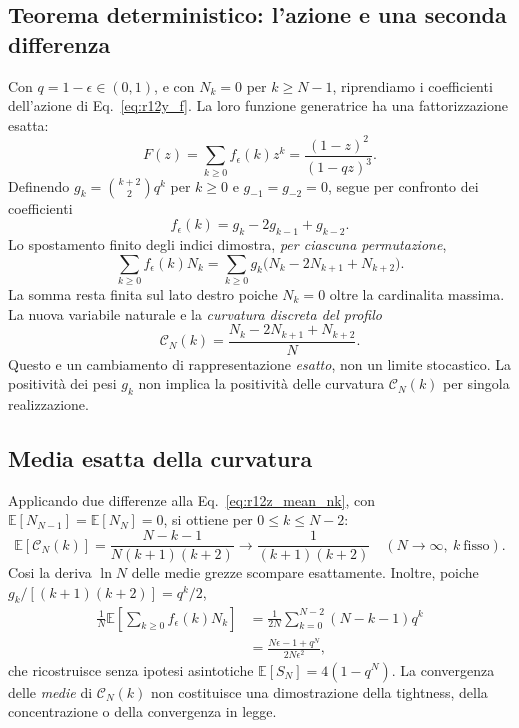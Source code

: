 \documentclass[11pt,a4paper]{article}
\begin{document}
\subsection{Teorema deterministico: l'azione e una seconda differenza}

Con $q=1-\epsilon\in(0,1)$, e con $N_k=0$ per $k\ge N-1$, riprendiamo i coefficienti dell'azione di Eq.~\eqref{eq:r12y_f}. La loro funzione generatrice ha una fattorizzazione esatta:
\begin{equation}
F(z)=\sum_{k\ge0}f_\epsilon(k)z^k
=\frac{(1-z)^2}{(1-qz)^3}.
\label{eq:r12aa_generating}
\end{equation}
Definendo $g_k=\binom{k+2}{2}q^k$ per $k\ge0$ e $g_{-1}=g_{-2}=0$, segue per confronto dei coefficienti
\begin{equation}
f_\epsilon(k)=g_k-2g_{k-1}+g_{k-2}.
\label{eq:r12aa_second_diff_weight}
\end{equation}
Lo spostamento finito degli indici dimostra, \emph{per ciascuna permutazione},
\begin{equation}
\boxed{\sum_{k\ge0}f_\epsilon(k)N_k
=\sum_{k\ge0}g_k\bigl(N_k-2N_{k+1}+N_{k+2}\bigr).}
\label{eq:r12aa_discrete_curvature}
\end{equation}
La somma resta finita sul lato destro poiche $N_k=0$ oltre la cardinalita massima. La nuova variabile naturale e la \emph{curvatura discreta del profilo}
\begin{equation}
\mathcal C_N(k)=\frac{N_k-2N_{k+1}+N_{k+2}}{N}.
\label{eq:r12aa_curvature}
\end{equation}
Questo e un cambiamento di rappresentazione \emph{esatto}, non un limite stocastico. La positivit\`a dei pesi $g_k$ non implica la positivit\`a delle curvatura $\mathcal C_N(k)$ per singola realizzazione.

\subsection{Media esatta della curvatura}

Applicando due differenze alla Eq.~\eqref{eq:r12z_mean_nk}, con $\mathbb E[N_{N-1}]=\mathbb E[N_N]=0$, si ottiene per $0\le k\le N-2$:
\begin{equation}
\boxed{\mathbb E[\mathcal C_N(k)]
=\frac{N-k-1}{N(k+1)(k+2)}
\longrightarrow\frac{1}{(k+1)(k+2)}\quad(N\to\infty,\ k\ \mathrm{fisso}).}
\label{eq:r12aa_curvature_mean}
\end{equation}
Cosi la deriva $\ln N$ delle medie grezze scompare esattamente. Inoltre, poiche $g_k/[(k+1)(k+2)]=q^k/2$,
\begin{align}
\frac{1}{N}\mathbb E\!\left[\sum_{k\ge0}f_\epsilon(k)N_k\right]
&=\frac{1}{2N}\sum_{k=0}^{N-2}(N-k-1)q^k\\
&=\frac{N\epsilon-1+q^N}{2N\epsilon^2},
\label{eq:r12aa_action_check}
\end{align}
che ricostruisce senza ipotesi asintotiche $\mathbb E[S_N]=4(1-q^N)$. La convergenza delle \emph{medie} di $\mathcal C_N(k)$ non costituisce una dimostrazione della tightness, della concentrazione o della convergenza in legge.
\end{document}
